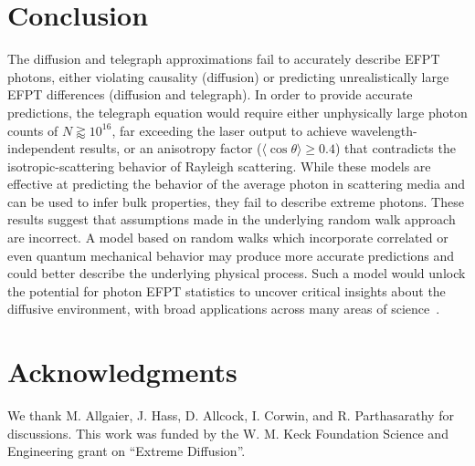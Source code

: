 \section{Conclusion}
The diffusion and telegraph approximations fail to accurately describe EFPT photons, either violating causality (diffusion) or predicting unrealistically large EFPT differences (diffusion and telegraph). In order to provide accurate predictions, the telegraph equation  would require either unphysically large photon counts of $N \gtrapprox 10^{16}$, far exceeding the laser output to achieve wavelength-independent results, or an anisotropy factor ($\langle \cos {\theta} \rangle \geq 0.4$) that contradicts the isotropic-scattering behavior of Rayleigh scattering. While these models are effective at predicting the behavior of the average photon in scattering media and can be used to infer bulk properties, they fail to describe extreme photons. These results suggest that assumptions made in the underlying random walk approach are incorrect. A model based on random walks which incorporate correlated or even quantum mechanical behavior may produce more accurate predictions and could better describe the underlying physical process. Such a model would unlock the potential for photon EFPT statistics to uncover critical insights about the diffusive environment, with broad applications across many areas of science~\cite{redner_guide_2001,weiss_applications_2002,godec_first_2016,noskowicz_average_1988,grebenkov_molecular_2021,polizzi_mean_2016,barney_first-passage-time_2017,zsurkis_first_2024,lawley_distribution_2020,lawley_slowest_2023,lawley_universal_2020,schuss_redundancy_2019,meerson_mortality_2015,chun_heterogeneous_2023}.

\section{Acknowledgments}
We thank M. Allgaier, J. Hass, D. Allcock, I. Corwin, and R. Parthasarathy for discussions. This work was funded by the W. M. Keck Foundation Science and Engineering grant on ``Extreme Diffusion''.

